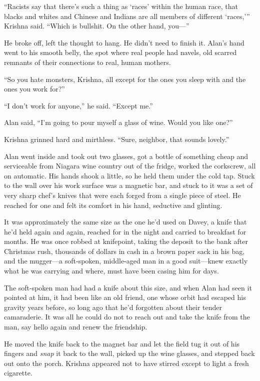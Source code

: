 ``Racists say that there's such a thing as `races' within the human
race, that blacks and whites and Chinese and Indians are all members
of different `races,''' Krishna said.  ``Which is bullshit.  On the
other hand, you---''

He broke off, left the thought to hang.  He didn't need to finish it. 
Alan's hand went to his smooth belly, the spot where real people had
navels, old scarred remnants of their connections to real, human
mothers.

``So you hate monsters, Krishna, all except for the ones you sleep
with and the ones you work for?''

``I don't work for anyone,'' he said.  ``Except me.''

Alan said, ``I'm going to pour myself a glass of wine.  Would you like
one?''

Krishna grinned hard and mirthless.  ``Sure, neighbor, that sounds
lovely.''

Alan went inside and took out two glasses, got a bottle of something
cheap and serviceable from Niagara wine country out of the fridge,
worked the corkscrew, all on automatic.  His hands shook a little, so
he held them under the cold tap.  Stuck to the wall over his work
surface was a magnetic bar, and stuck to it was a set of very sharp
chef's knives that were each forged from a single piece of steel.  He
reached for one and felt its comfort in his hand, seductive and
glinting.

It was approximately the same size as the one he'd used on Davey, a
knife that he'd held again and again, reached for in the night and
carried to breakfast for months.  He was once robbed at knifepoint,
taking the deposit to the bank after Christmas rush, thousands of
dollars in cash in a brown paper sack in his bag, and the mugger---a
soft-spoken, middle-aged man in a good suit---knew exactly what he was
carrying and where, must have been casing him for days.

The soft-spoken man had had a knife about this size, and when Alan had
seen it pointed at him, it had been like an old friend, one whose
orbit had escaped his gravity years before, so long ago that he'd
forgotten about their tender camaraderie.  It was all he could do not
to reach out and take the knife from the man, say hello again and
renew the friendship.

He moved the knife back to the magnet bar and let the field tug it out
of his fingers and \textit{snap} it back to the wall, picked up the
wine glasses, and stepped back out onto the porch.  Krishna appeared
not to have stirred except to light a fresh cigarette.

